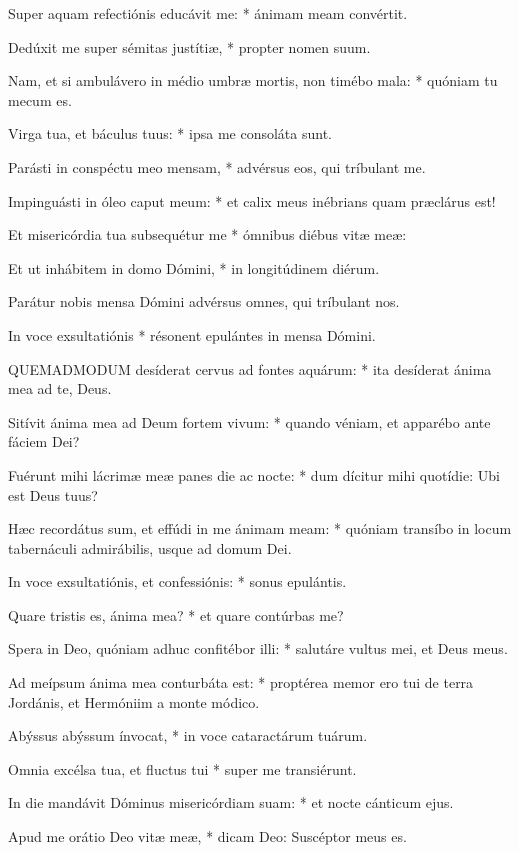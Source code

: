 Super aquam refectiónis educávit me: * ánimam meam convértit.

Dedúxit me super sémitas justítiæ, * propter nomen suum.

Nam, et si ambulávero in médio umbræ mortis, non timébo mala: * quóniam tu mecum es.

Virga tua, et báculus tuus: * ipsa me consoláta sunt.

Parásti in conspéctu meo mensam, * advérsus eos, qui tríbulant me.

Impinguásti in óleo caput meum: * et calix meus inébrians quam præclárus est!

Et misericórdia tua subsequétur me * ómnibus diébus vitæ meæ:

Et ut inhábitem in domo Dómini, * in longitúdinem diérum.

 Parátur nobis mensa Dómini advérsus omnes, qui tríbulant nos.

 In voce exsultatiónis * résonent epulántes in mensa Dómini.


\lettrine[lines=2]{Q}{UEMADMODUM} desíderat cervus ad fontes aquárum: * ita desíderat ánima mea ad te, Deus.

Sitívit ánima mea ad Deum fortem vivum: * quando véniam, et apparébo ante fáciem Dei?

Fuérunt mihi lácrimæ meæ panes die ac nocte: * dum dícitur mihi quotídie: Ubi est Deus tuus?

Hæc recordátus sum, et effúdi in me ánimam meam: * quóniam transíbo in locum tabernáculi admirábilis, usque ad domum Dei.

In voce exsultatiónis, et confessiónis: * sonus epulántis.

Quare tristis es, ánima mea? * et quare contúrbas me?

Spera in Deo, quóniam adhuc confitébor illi: * salutáre vultus mei, et Deus meus.

Ad meípsum ánima mea conturbáta est: * proptérea memor ero tui de terra Jordánis, et Hermóniim a monte módico.

Abýssus abýssum ínvocat, * in voce cataractárum tuárum.

Omnia excélsa tua, et fluctus tui * super me transiérunt.

In die mandávit Dóminus misericórdiam suam: * et nocte cánticum ejus.

Apud me orátio Deo vitæ meæ, * dicam Deo: Suscéptor meus es.


